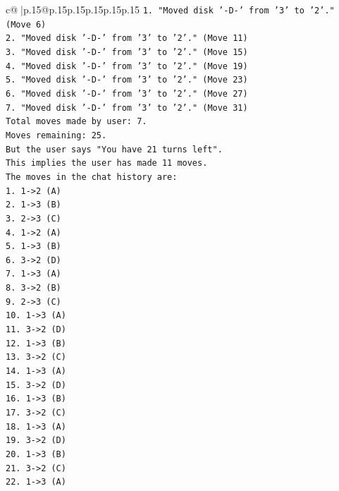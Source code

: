 \documentclass{article}
\begin{document}
{\begin{supertabular}{c@{$\;$}|p{.15\linewidth}@{}p{.15\linewidth}p{.15\linewidth}p{.15\linewidth}p{.15\linewidth}p{.15\linewidth}}
{{{\texttt{1. "Moved disk '{-}D{-}' from '3' to '2'." (Move 6)} \\
\texttt{2. "Moved disk '{-}D{-}' from '3' to '2'." (Move 11)} \\
\texttt{3. "Moved disk '{-}D{-}' from '3' to '2'." (Move 15)} \\
\texttt{4. "Moved disk '{-}D{-}' from '3' to '2'." (Move 19)} \\
\texttt{5. "Moved disk '{-}D{-}' from '3' to '2'." (Move 23)} \\
\texttt{6. "Moved disk '{-}D{-}' from '3' to '2'." (Move 27)} \\
\texttt{7. "Moved disk '{-}D{-}' from '3' to '2'." (Move 31)} \\
\texttt{Total moves made by user: 7.} \\
\texttt{Moves remaining: 25.} \\
\texttt{But the user says "You have 21 turns left".} \\
\texttt{This implies the user has made 11 moves.} \\
\texttt{The moves in the chat history are:} \\
\texttt{1. 1{-}>2 (A)} \\
\texttt{2. 1{-}>3 (B)} \\
\texttt{3. 2{-}>3 (C)} \\
\texttt{4. 1{-}>2 (A)} \\
\texttt{5. 1{-}>3 (B)} \\
\texttt{6. 3{-}>2 (D)} \\
\texttt{7. 1{-}>3 (A)} \\
\texttt{8. 3{-}>2 (B)} \\
\texttt{9. 2{-}>3 (C)} \\
\texttt{10. 1{-}>3 (A)} \\
\texttt{11. 3{-}>2 (D)} \\
\texttt{12. 1{-}>3 (B)} \\
\texttt{13. 3{-}>2 (C)} \\
\texttt{14. 1{-}>3 (A)} \\
\texttt{15. 3{-}>2 (D)} \\
\texttt{16. 1{-}>3 (B)} \\
\texttt{17. 3{-}>2 (C)} \\
\texttt{18. 1{-}>3 (A)} \\
\texttt{19. 3{-}>2 (D)} \\
\texttt{20. 1{-}>3 (B)} \\
\texttt{21. 3{-}>2 (C)} \\
\texttt{22. 1{-}>3 (A)} \\
}}}
\end{supertabular}}
\end{document}
